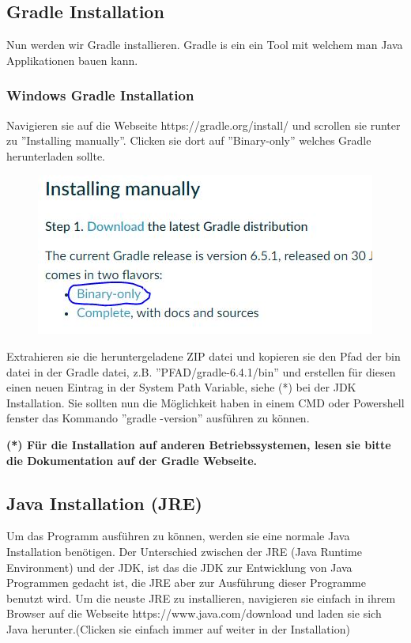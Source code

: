 \documentclass[fontsize=12pt,paper=a4,twoside]{scrartcl}
\begin{document}
\subsection{Gradle Installation}

Nun werden wir Gradle installieren. Gradle is ein ein Tool mit welchem man Java Applikationen bauen kann.

\subsubsection{Windows Gradle Installation}

Navigieren sie auf die Webseite https://gradle.org/install/ und scrollen sie runter zu ''Installing manually''. Clicken sie dort auf ''Binary-only'' welches Gradle herunterladen sollte.
\begin{figure}[H]
\centering
\includegraphics[width=0.5\linewidth]{GradleDownload.JPG}
\end{figure} 

Extrahieren sie die heruntergeladene ZIP datei und kopieren sie den Pfad der bin datei in der Gradle datei, z.B. ''PFAD/gradle-6.4.1/bin'' und erstellen für diesen einen neuen Eintrag in der System Path Variable, siehe (*) bei der JDK Installation. Sie sollten nun die Möglichkeit haben in einem CMD oder Powershell fenster das Kommando ''gradle -version'' ausführen zu können.

\textbf{(*) Für die Installation auf anderen Betriebssystemen, lesen sie bitte die Dokumentation auf der Gradle Webseite.}


\subsection{Java Installation (JRE)}

Um das Programm ausführen zu können, werden sie eine normale Java Installation benötigen. Der Unterschied zwischen der JRE (Java Runtime Environment) und der JDK, ist das die JDK zur Entwicklung von Java Programmen gedacht ist, die JRE aber zur Ausführung dieser Programme benutzt wird. Um die neuste JRE zu installieren, navigieren sie einfach in ihrem Browser auf die Webseite https://www.java.com/download und laden sie sich Java herunter.(Clicken sie einfach immer auf weiter in der Installation)
\end{document}
